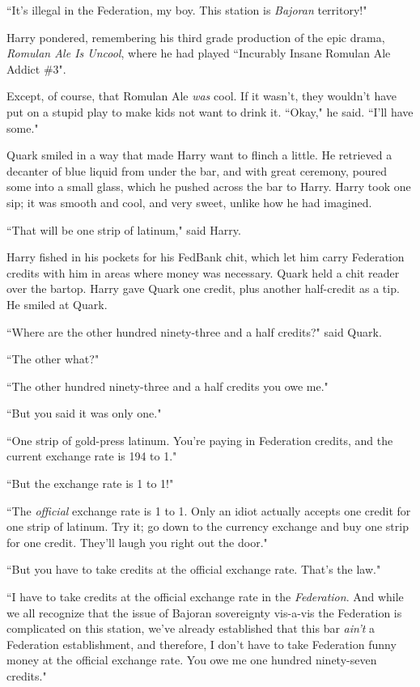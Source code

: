 \documentclass[twoside,letterpaper,12pt]{memoir}
\begin{document}
``It's illegal in the Federation, my boy. This station is \textit{Bajoran} territory!"

Harry pondered, remembering his third grade production of the epic drama, \textit{Romulan Ale Is Uncool}, where he had played ``Incurably Insane Romulan Ale Addict \#3".

Except, of course, that Romulan Ale \textit{was} cool. If it wasn't, they wouldn't have put on a stupid play to make kids not want to drink it. ``Okay," he said. ``I'll have some."

Quark smiled in a way that made Harry want to flinch a little. He retrieved a decanter of blue liquid from under the bar, and with great ceremony, poured some into a small glass, which he pushed across the bar to Harry. Harry took one sip; it was smooth and cool, and very sweet, unlike how he had imagined.

``That will be one strip of latinum," said Harry.

Harry fished in his pockets for his FedBank chit, which let him carry Federation credits with him in areas where money was necessary. Quark held a chit reader over the bartop. Harry gave Quark one credit, plus another half-credit as a tip. He smiled at Quark.

``Where are the other hundred ninety-three and a half credits?" said Quark.

``The other what?"

``The other hundred ninety-three and a half credits you owe me."

``But you said it was only one."

``One strip of gold-press latinum. You're paying in Federation credits, and the current exchange rate is 194 to 1."

``But the exchange rate is 1 to 1!"

``The \textit{official} exchange rate is 1 to 1. Only an idiot actually accepts one credit for one strip of latinum. Try it; go down to the currency exchange and buy one strip for one credit. They'll laugh you right out the door."

``But you have to take credits at the official exchange rate. That's the law."

``I have to take credits at the official exchange rate in the \textit{Federation}. And while we all recognize that the issue of Bajoran sovereignty vis-a-vis the Federation is complicated on this station, we've already established that this bar \textit{ain't} a Federation establishment, and therefore, I don't have to take Federation funny money at the official exchange rate. You owe me one hundred ninety-seven credits."
\end{document}
